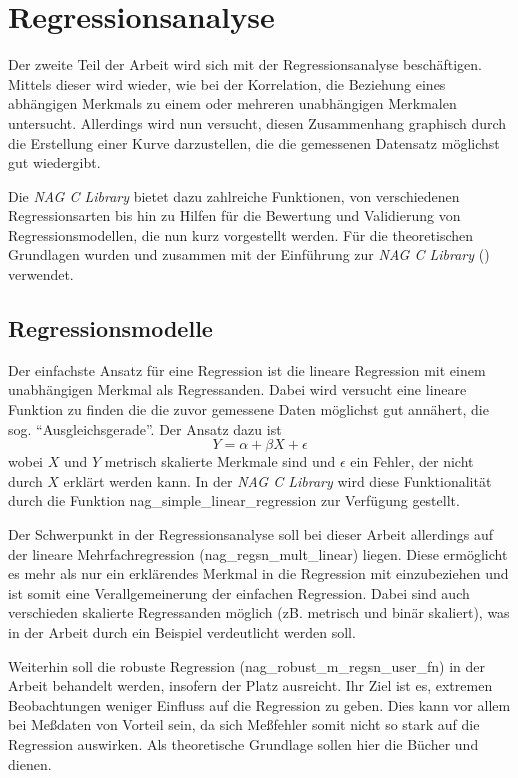 \section{Regressionsanalyse}

Der zweite Teil der Arbeit wird sich mit der Regressionsanalyse beschäftigen.
Mittels dieser wird wieder, wie bei der Korrelation, die Beziehung eines abhängigen Merkmals zu einem oder mehreren unabhängigen Merkmalen untersucht.
Allerdings wird nun versucht, diesen Zusammenhang graphisch durch die Erstellung einer Kurve darzustellen, die die gemessenen Datensatz möglichst gut wiedergibt.

Die {\it NAG C Library} bietet dazu zahlreiche Funktionen, von verschiedenen Regressionsarten bis hin zu Hilfen für die Bewertung und Validierung von Regressionsmodellen, die nun kurz vorgestellt werden.
Für die theoretischen Grundlagen wurden \cite{Cramer2007} und \cite{Fahrmeier2010} zusammen mit der Einführung zur {\it NAG C Library} (\cite{nag:intro}) verwendet.

\subsection{Regressionsmodelle}

Der einfachste Ansatz für eine Regression ist die lineare Regression mit einem unabhängigen Merkmal als Regressanden.
Dabei wird versucht eine lineare Funktion zu finden die die zuvor gemessene Daten möglichst gut annähert, die sog. "`Ausgleichsgerade"'.
Der Ansatz dazu ist
\begin{equation*}
 Y = \alpha + \beta X +\epsilon
\end{equation*}
wobei $X$ und $Y$ metrisch skalierte Merkmale sind und $\epsilon$ ein Fehler, der nicht durch $X$ erklärt werden kann.
In der {\it NAG C Library} wird diese Funktionalität durch die Funktion nag\_simple\_linear\_regression zur Verfügung gestellt.

Der Schwerpunkt in der Regressionsanalyse soll bei dieser Arbeit allerdings auf der lineare Mehrfachregression (nag\_regsn\_mult\_linear) liegen.
Diese ermöglicht es mehr als nur ein erklärendes Merkmal in die Regression mit einzubeziehen und ist somit eine Verallgemeinerung der einfachen Regression.
Dabei sind auch verschieden skalierte Regressanden möglich (zB. metrisch und binär skaliert), was in der Arbeit durch ein Beispiel verdeutlicht werden soll.

Weiterhin soll die robuste Regression (nag\_robust\_m\_regsn\_user\_fn) in der Arbeit behandelt werden, insofern der Platz ausreicht.
Ihr Ziel ist es, extremen Beobachtungen weniger Einfluss auf die Regression zu geben.
Dies kann vor allem bei Meßdaten von Vorteil sein, da sich Meßfehler somit nicht so stark auf die Regression auswirken.
Als theoretische Grundlage sollen hier die Bücher \cite{Hampel1986} und \cite{Huber1981} dienen.


